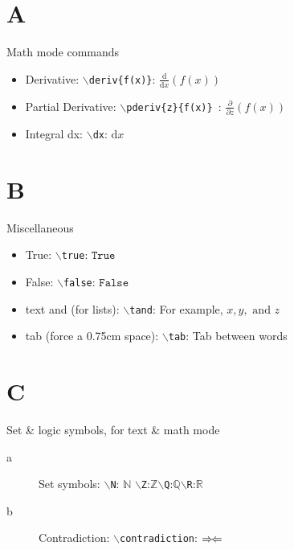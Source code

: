\documentclass{article}
\newcommand{\deriv}[1]{\frac{\mathrm{d}}{\mathrm{d}x} (#1)}
\newcommand{\pderiv}[2]{\frac{\partial}{\partial #1} (#2)}
\newcommand{\dx}{\mathrm{d}x}
\newcommand{\true}{\ensuremath{\texttt{True }}}
\newcommand{\false}{\ensuremath{\texttt{False }}}
\newcommand{\tand}{\text{ and }}
\newcommand{\tab}{\hspace*{0.75cm}}
\newcommand{\N}{\ensuremath{\mathbb{N}}}
\newcommand{\Z}{\ensuremath{\mathbb{Z}}}
\newcommand{\Q}{\ensuremath{\mathbb{Q}}}
\newcommand{\R}{\ensuremath{\mathbb{R}}}
\newcommand{\contradiction}{\ensuremath{\Rightarrow \mspace{-2mu} \Leftarrow}} %
\begin{document}
	\section*{A} Math mode commands
	\begin{itemize}
		\item Derivative: \texttt{$\backslash$deriv\{f(x)\}}: $\deriv{f(x)}$
		\item Partial Derivative: \texttt{$\backslash$pderiv\{z\}\{f(x)\} }: $\pderiv{z}{f(x)}$
		\item Integral dx: \texttt{$\backslash$dx}: $\dx$
	\end{itemize}
	\section*{B} Miscellaneous
	\begin{itemize}
		\item True: \texttt{$\backslash$true}: $\true$
		\item False: \texttt{$\backslash$false}: \false
		\item text and (for lists): \texttt{$\backslash$tand}: For example, $x,y, \tand z$
		\item tab (force a 0.75cm space): \texttt{$\backslash$tab}: Tab \tab between \tab words
	\end{itemize}
	\section*{C} Set \& logic symbols, for text \& math mode
	\begin{description}
		\item[a] Set symbols: \texttt{$\backslash$N}: $\N$ \tab \texttt{$\backslash$Z}:\Z \tab \texttt{$\backslash$Q}:\Q \tab \texttt{$\backslash$R}:\R
		\item[b] Contradiction: \texttt{$\backslash$contradiction}: \contradiction
	\end{description}
\end{document}
